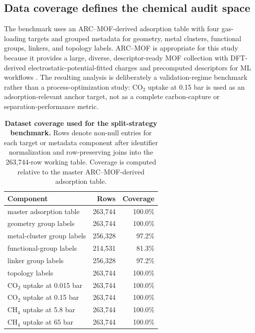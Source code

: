 \documentclass[11pt,a4paper]{article}
\begin{document}
\subsection*{Data coverage defines the chemical audit space}
The benchmark uses an ARC--MOF-derived adsorption table with four gas-loading targets and grouped metadata for geometry, metal clusters, functional groups, linkers, and topology labels. ARC--MOF is appropriate for this study because it provides a large, diverse, descriptor-ready MOF collection with DFT-derived electrostatic-potential-fitted charges and precomputed descriptors for ML workflows \citep{Burner2023ARCMOF}. The resulting analysis is deliberately a validation-regime benchmark rather than a process-optimization study: CO$_2$ uptake at 0.15 bar is used as an adsorption-relevant anchor target, not as a complete carbon-capture or separation-performance metric. 


\begin{table}[H]
\centering
\caption{\textbf{Dataset coverage used for the split-strategy benchmark.} Rows denote non-null entries for each target or metadata component after identifier normalization and row-preserving joins into the 263,744-row working table. Coverage is computed relative to the master ARC--MOF-derived adsorption table.}
\label{tab:coverage}
\begin{tabular}{lrr}
\toprule
Component & Rows & Coverage \\
\midrule
master adsorption table & 263,744 & 100.0\% \\
geometry group labels & 263,744 & 100.0\% \\
metal-cluster group labels & 256,328 & 97.2\% \\
functional-group labels & 214,531 & 81.3\% \\
linker group labels & 256,328 & 97.2\% \\
topology labels & 263,744 & 100.0\% \\
CO$_2$ uptake at 0.015 bar & 263,744 & 100.0\% \\
CO$_2$ uptake at 0.15 bar & 263,744 & 100.0\% \\
CH$_4$ uptake at 5.8 bar & 263,744 & 100.0\% \\
CH$_4$ uptake at 65 bar & 263,744 & 100.0\% \\
\bottomrule
\end{tabular}
\end{table}
\end{document}

